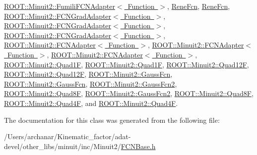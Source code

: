 \mbox{\hyperlink{classROOT_1_1Minuit2_1_1FumiliFCNAdapter_aeed5b77f0bcca4854a9e6b0620ab3cb9}{R\+O\+O\+T\+::\+Minuit2\+::\+Fumili\+F\+C\+N\+Adapter$<$ Function $>$}}, \mbox{\hyperlink{classReneFcn_a5e7e439a47c37d673d9366918c74239c}{Rene\+Fcn}}, \mbox{\hyperlink{classReneFcn_a5e7e439a47c37d673d9366918c74239c}{Rene\+Fcn}}, \mbox{\hyperlink{classROOT_1_1Minuit2_1_1FCNGradAdapter_a99e41f07b3f7374c0b17ef42f1c15a19}{R\+O\+O\+T\+::\+Minuit2\+::\+F\+C\+N\+Grad\+Adapter$<$ Function $>$}}, \mbox{\hyperlink{classROOT_1_1Minuit2_1_1FCNGradAdapter_a99e41f07b3f7374c0b17ef42f1c15a19}{R\+O\+O\+T\+::\+Minuit2\+::\+F\+C\+N\+Grad\+Adapter$<$ Function $>$}}, \mbox{\hyperlink{classROOT_1_1Minuit2_1_1FCNGradAdapter_a99e41f07b3f7374c0b17ef42f1c15a19}{R\+O\+O\+T\+::\+Minuit2\+::\+F\+C\+N\+Grad\+Adapter$<$ Function $>$}}, \mbox{\hyperlink{classROOT_1_1Minuit2_1_1FCNAdapter_a3bcb29efda3b97c17bb17512c1629365}{R\+O\+O\+T\+::\+Minuit2\+::\+F\+C\+N\+Adapter$<$ Function $>$}}, \mbox{\hyperlink{classROOT_1_1Minuit2_1_1FCNAdapter_a3bcb29efda3b97c17bb17512c1629365}{R\+O\+O\+T\+::\+Minuit2\+::\+F\+C\+N\+Adapter$<$ Function $>$}}, \mbox{\hyperlink{classROOT_1_1Minuit2_1_1FCNAdapter_a3bcb29efda3b97c17bb17512c1629365}{R\+O\+O\+T\+::\+Minuit2\+::\+F\+C\+N\+Adapter$<$ Function $>$}}, \mbox{\hyperlink{classROOT_1_1Minuit2_1_1Quad1F_a14469d6031751fa382120df6327da5ee}{R\+O\+O\+T\+::\+Minuit2\+::\+Quad1F}}, \mbox{\hyperlink{classROOT_1_1Minuit2_1_1Quad1F_a14469d6031751fa382120df6327da5ee}{R\+O\+O\+T\+::\+Minuit2\+::\+Quad1F}}, \mbox{\hyperlink{classROOT_1_1Minuit2_1_1Quad12F_afbb216349fbceafc530845fe1cff5af4}{R\+O\+O\+T\+::\+Minuit2\+::\+Quad12F}}, \mbox{\hyperlink{classROOT_1_1Minuit2_1_1Quad12F_afbb216349fbceafc530845fe1cff5af4}{R\+O\+O\+T\+::\+Minuit2\+::\+Quad12F}}, \mbox{\hyperlink{classROOT_1_1Minuit2_1_1GaussFcn_a7e73468f853c287df3b5da240c3b5bb5}{R\+O\+O\+T\+::\+Minuit2\+::\+Gauss\+Fcn}}, \mbox{\hyperlink{classROOT_1_1Minuit2_1_1GaussFcn_a7e73468f853c287df3b5da240c3b5bb5}{R\+O\+O\+T\+::\+Minuit2\+::\+Gauss\+Fcn}}, \mbox{\hyperlink{classROOT_1_1Minuit2_1_1GaussFcn2_aef7172f9af50244bc9fce0c96cc21e81}{R\+O\+O\+T\+::\+Minuit2\+::\+Gauss\+Fcn2}}, \mbox{\hyperlink{classROOT_1_1Minuit2_1_1Quad8F_a8f241ff1340ea2184c7ee9247b8b200a}{R\+O\+O\+T\+::\+Minuit2\+::\+Quad8F}}, \mbox{\hyperlink{classROOT_1_1Minuit2_1_1GaussFcn2_aef7172f9af50244bc9fce0c96cc21e81}{R\+O\+O\+T\+::\+Minuit2\+::\+Gauss\+Fcn2}}, \mbox{\hyperlink{classROOT_1_1Minuit2_1_1Quad8F_a8f241ff1340ea2184c7ee9247b8b200a}{R\+O\+O\+T\+::\+Minuit2\+::\+Quad8F}}, \mbox{\hyperlink{classROOT_1_1Minuit2_1_1Quad4F_a19ebb5413722895a7635626cca02ebe9}{R\+O\+O\+T\+::\+Minuit2\+::\+Quad4F}}, and \mbox{\hyperlink{classROOT_1_1Minuit2_1_1Quad4F_a19ebb5413722895a7635626cca02ebe9}{R\+O\+O\+T\+::\+Minuit2\+::\+Quad4F}}.



The documentation for this class was generated from the following file\+:\begin{DoxyCompactItemize}
\item 
/\+Users/archanar/\+Kinematic\+\_\+factor/adat-\/devel/other\+\_\+libs/minuit/inc/\+Minuit2/\mbox{\hyperlink{adat-devel_2other__libs_2minuit_2inc_2Minuit2_2FCNBase_8h}{F\+C\+N\+Base.\+h}}\end{DoxyCompactItemize}

